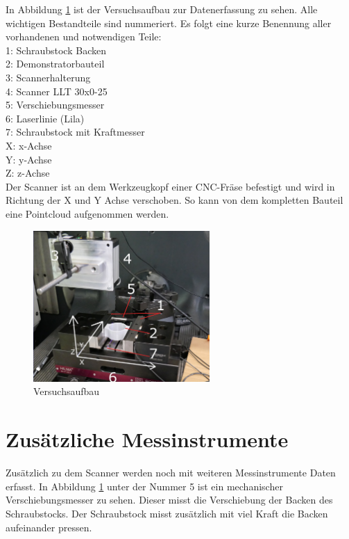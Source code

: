 In Abbildung \ref{fig:versuchsaufbau} ist der Versuchsaufbau zur Datenerfassung 
zu sehen. Alle wichtigen Bestandteile sind nummeriert. Es folgt eine kurze Benennung
aller vorhandenen und notwendigen Teile:\\
1: Schraubstock Backen\\
2: Demonstratorbauteil\\
3: Scannerhalterung\\
4: Scanner LLT 30x0-25\\
5: Verschiebungsmesser\\
6: Laserlinie (Lila)\\
7: Schraubstock mit Kraftmesser\\
X: x-Achse\\
Y: y-Achse\\
Z: z-Achse\\

Der Scanner ist an dem Werkzeugkopf einer CNC-Fräse befestigt und wird 
in Richtung der X und Y Achse verschoben. So kann von dem kompletten Bauteil eine 
Pointcloud aufgenommen werden.

\begin{figure}[H]
    \centering
    \includegraphics[width=0.6\textwidth]{images/versuchsaufbau_foto.png.JPG}
    \caption{Versuchsaufbau}
    \label{fig:versuchsaufbau}
\end{figure}

\section{Zusätzliche Messinstrumente}

Zusätzlich zu dem Scanner werden noch mit weiteren Messinstrumente Daten erfasst.
In Abbildung \ref{fig:versuchsaufbau} unter der Nummer 5 ist ein mechanischer 
Verschiebungsmesser zu sehen. Dieser misst die Verschiebung der Backen des 
Schraubstocks. Der Schraubstock misst zusätzlich mit viel Kraft die Backen 
aufeinander pressen.

